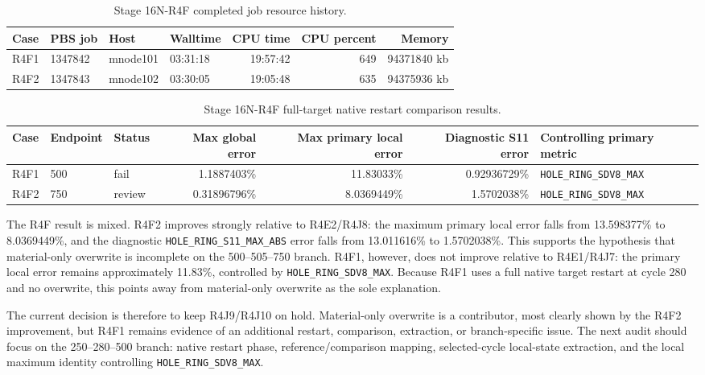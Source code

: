 \documentclass[11pt,a4paper]{article}
\newcommand{\code}[1]{\texttt{#1}}
\begin{document}
\begin{table}[H]
\centering
\caption{Stage 16N-R4F completed job resource history.}
\begin{tabular}{llllrrr}
\toprule
Case & PBS job & Host & Walltime & CPU time & CPU percent & Memory \\
\midrule
R4F1 & 1347842 & mnode101 & 03:31:18 & 19:57:42 & 649 & 94371840 kb \\
R4F2 & 1347843 & mnode102 & 03:30:05 & 19:05:48 & 635 & 94375936 kb \\
\bottomrule
\end{tabular}
\end{table}

\begin{table}[H]
\centering
\caption{Stage 16N-R4F full-target native restart comparison results.}
\begin{tabular}{lllrrrl}
\toprule
Case & Endpoint & Status & Max global error & Max primary local error & Diagnostic S11 error & Controlling primary metric \\
\midrule
R4F1 & 500 & fail & 1.1887403\% & 11.83033\% & 0.92936729\% & \code{HOLE\_RING\_SDV8\_MAX} \\
R4F2 & 750 & review & 0.31896796\% & 8.0369449\% & 1.5702038\% & \code{HOLE\_RING\_SDV8\_MAX} \\
\bottomrule
\end{tabular}
\end{table}

The R4F result is mixed. R4F2 improves strongly relative to R4E2/R4J8: the maximum primary local error falls from 13.598377\% to 8.0369449\%, and the diagnostic \code{HOLE\_RING\_S11\_MAX\_ABS} error falls from 13.011616\% to 1.5702038\%. This supports the hypothesis that material-only overwrite is incomplete on the 500--505--750 branch. R4F1, however, does not improve relative to R4E1/R4J7: the primary local error remains approximately 11.83\%, controlled by \code{HOLE\_RING\_SDV8\_MAX}. Because R4F1 uses a full native target restart at cycle 280 and no overwrite, this points away from material-only overwrite as the sole explanation.

The current decision is therefore to keep R4J9/R4J10 on hold. Material-only overwrite is a contributor, most clearly shown by the R4F2 improvement, but R4F1 remains evidence of an additional restart, comparison, extraction, or branch-specific issue. The next audit should focus on the 250--280--500 branch: native restart phase, reference/comparison mapping, selected-cycle local-state extraction, and the local maximum identity controlling \code{HOLE\_RING\_SDV8\_MAX}.
\end{document}
